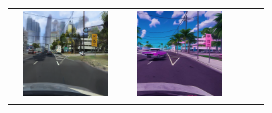 \documentclass{VUMIFPSbakalaurinis}
\begin{document}
\begin{table}[H]
{\begin{tabular}{|c|c|c|c|}
            \includegraphics[width=100,height=85]{img/diffusion/cycle/7c9cf422-f19cd065} & 
            \includegraphics[width=100,height=85]{img/diffusion/instruct/7c9cf422-f19cd065} \\

\end{tabular}}
\end{table}
\end{document}
